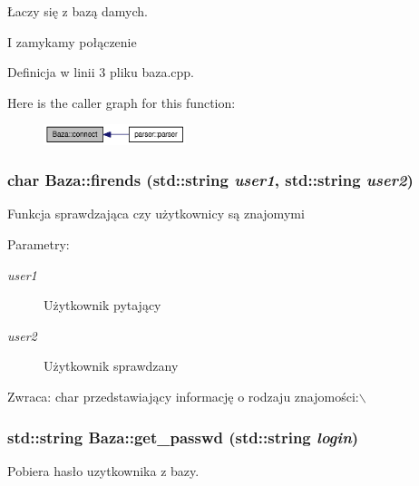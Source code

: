 Łaczy się z bazą damych. 



I zamykamy połączenie 

Definicja w linii 3 pliku baza.cpp.

Here is the caller graph for this function:\nopagebreak
\begin{figure}[H]
\begin{center}
\leavevmode
\includegraphics[width=118pt]{d8/d84/a00001_bef61cc396e46d347a47c75e9ef8dfde_icgraph}
\end{center}
\end{figure}
\hypertarget{a00001_71ac41633bfb8e4b854aaa8281aac24c}{
\subsubsection[{firends}]{\setlength{\rightskip}{0pt plus 5cm}char Baza::firends (std::string {\em user1}, \/  std::string {\em user2})}}
\label{d8/d84/a00001_71ac41633bfb8e4b854aaa8281aac24c}


Funkcja sprawdzająca czy użytkownicy są znajomymi \begin{Desc}
\item[Parametry:]
\begin{description}
\item[{\em user1}]Użytkownik pytający \item[{\em user2}]Użytkownik sprawdzany \end{description}
\end{Desc}
\begin{Desc}
\item[Zwraca:]char przedstawiający informację o rodzaju znajomości:$\backslash$ \end{Desc}
\hypertarget{a00001_a09b37e4665bd7b2f2b8b54f8120f5be}{
\subsubsection[{get\_\-passwd}]{\setlength{\rightskip}{0pt plus 5cm}std::string Baza::get\_\-passwd (std::string {\em login})}}
\label{d8/d84/a00001_a09b37e4665bd7b2f2b8b54f8120f5be}


Pobiera hasło uzytkownika z bazy. 



